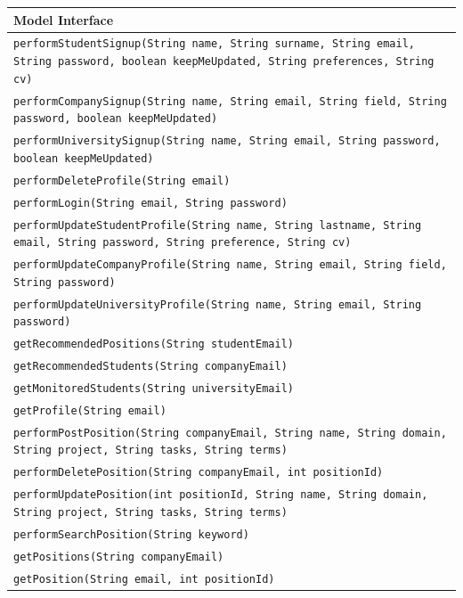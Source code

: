 \renewcommand{\arraystretch}{1.5}
\begin{longtable}{|p{14.5cm}|}
    \hline
    \cellcolor{customgrey}\textbf{Model Interface} \\ \hline
    \texttt{performStudentSignup(String name, String surname, String email, String password, boolean keepMeUpdated, String preferences, String cv)} \\ \hline
    \texttt{performCompanySignup(String name, String email, String field, String password, boolean keepMeUpdated)} \\ \hline
    \texttt{performUniversitySignup(String name, String email, String password, boolean keepMeUpdated)} \\ \hline
    \texttt{performDeleteProfile(String email)} \\ \hline
    \texttt{performLogin(String email, String password)} \\ \hline
    \texttt{performUpdateStudentProfile(String name, String lastname, String email, String password, String preference, String cv)} \\ \hline
    \texttt{performUpdateCompanyProfile(String name, String email, String field, String password)} \\ \hline
    \texttt{performUpdateUniversityProfile(String name, String email, String password)} \\ \hline
    \texttt{getRecommendedPositions(String studentEmail)} \\ \hline
    \texttt{getRecommendedStudents(String companyEmail)} \\ \hline
    \texttt{getMonitoredStudents(String universityEmail)} \\ \hline
    \texttt{getProfile(String email)} \\ \hline

    \texttt{performPostPosition(String companyEmail, String name, String domain, String project, String tasks, String terms)} \\ \hline
    \texttt{performDeletePosition(String companyEmail, int positionId)} \\ \hline
    \texttt{performUpdatePosition(int positionId, String name, String domain, String project, String tasks, String terms)} \\ \hline
    \texttt{performSearchPosition(String keyword)} \\ \hline
    \texttt{getPositions(String companyEmail)} \\ \hline
    \texttt{getPosition(String email, int positionId)} \\ \hline


\end{longtable}
